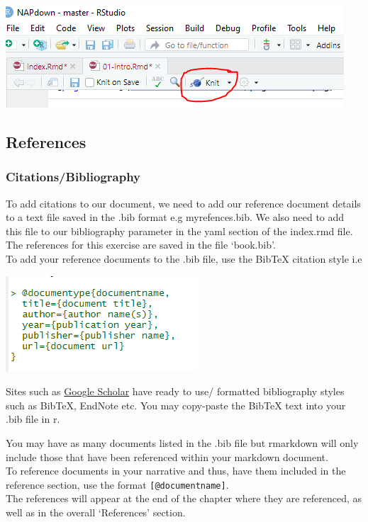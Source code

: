 \documentclass[
]{book}
\let\origfigure\figure
\let\endorigfigure\endfigure
\renewenvironment{figure}[1][2] {
    \expandafter\origfigure\expandafter[H]
} {
    \endorigfigure
}
\begin{document}
\begin{figure}
\centering
\includegraphics{tutorial_screenshots/knit_button.png}
\caption{knit}
\end{figure}

\hypertarget{references}{%
\subsection{References}\label{references}}

\hypertarget{citationsbibliography}{%
\subsubsection{Citations/Bibliography}\label{citationsbibliography}}

To add citations to our document, we need to add our reference document details to a text file saved in the .bib format e.g myrefences.bib. We also need to add this file to our bibliography parameter in the yaml section of the index.rmd file.\\
The references for this exercise are saved in the file `book.bib'.\\
To add your reference documents to the .bib file, use the BibTeX citation style i.e

\begin{figure}
\centering
\includegraphics{tutorial_screenshots/citations.png}
\caption{citations}
\end{figure}

Sites such as \href{https://scholar.google.com/}{Google Scholar} have ready to use/ formatted bibliography styles such as BibTeX, EndNote etc. You may copy-paste the BibTeX text into your .bib file in r.

You may have as many documents listed in the .bib file but rmarkdown will only include those that have been referenced within your markdown document.\\
To reference documents in your narrative and thus, have them included in the reference section, use the format \texttt{{[}@documentname{]}}.\\
The references will appear at the end of the chapter where they are referenced, as well as in the overall `References' section.
\end{document}
